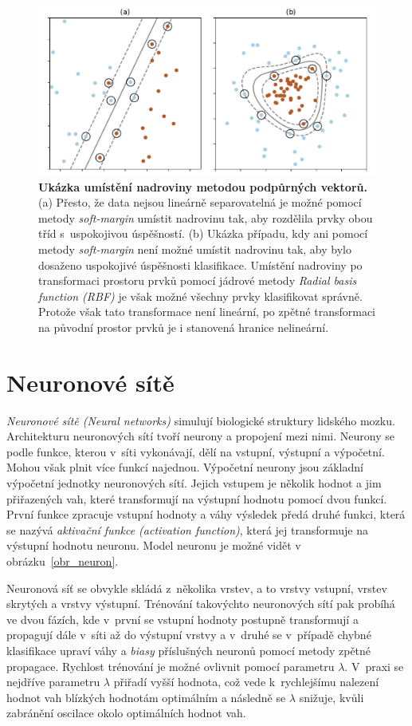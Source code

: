 \begin{figure}[h]
    \centering
    \includegraphics[width=\textwidth]{obrazky/svm.pdf}
    \caption{\textbf{Ukázka umístění nadroviny metodou podpůrných vektorů.} (a) Přesto, že data nejsou lineárně separovatelná je možné pomocí metody \textit{soft-margin} umístit nadrovinu tak, aby rozdělila prvky obou tříd s~uspokojivou úspěšností. (b) Ukázka případu, kdy ani pomocí metody \textit{soft-margin} není možné umístit nadrovinu tak, aby bylo dosaženo uspokojivé úspěšnosti klasifikace. Umístění nadroviny po transformaci prostoru prvků pomocí jádrové metody \textit{Radial basis function (RBF)} je však možné všechny prvky klasifikovat správně. Protože však tato transformace není lineární, po zpětné transformaci na původní prostor prvků je i stanovená hranice nelineární.}
    \label{obr_svm}
\end{figure}

\section{Neuronové sítě}
\label{neuronove_site}
\textit{Neuronové sítě (Neural networks)} simulují biologické struktury lidského mozku. Architekturu neuronových sítí tvoří neurony a propojení mezi nimi. Neurony se podle funkce, kterou v~síti vykonávají, dělí na vstupní, výstupní a výpočetní. Mohou však plnit více funkcí najednou. Výpočetní neurony jsou základní výpočetní jednotky neuronových sítí. Jejich vstupem je několik hodnot a jim přiřazených vah, které transformují na výstupní hodnotu pomocí dvou funkcí. První funkce zpracuje vstupní hodnoty a váhy výsledek předá druhé funkci, která se nazývá \textit{aktivační funkce (activation function)}, která jej transformuje na výstupní hodnotu neuronu. Model neuronu je možné vidět v obrázku~\ref{obr_neuron}.\cite{data_classification}\cite{machine_learning}

Neuronová síť se obvykle skládá z~několika vrstev, a to vrstvy vstupní, vrstev skrytých a vrstvy výstupní. Trénování takovýchto neuronových sítí pak probíhá ve dvou fázích, kde v~první se vstupní hodnoty postupně transformují a propagují dále v~síti až do výstupní vrstvy a v~druhé se v~případě chybné klasifikace upraví váhy a \textit{biasy} příslušných neuronů pomocí metody zpětné propagace. Rychlost trénování je možné ovlivnit pomocí parametru $\lambda$. V~praxi se nejdříve parametru $\lambda$ přiřadí vyšší hodnota, což vede k~rychlejšímu nalezení hodnot vah blízkých hodnotám optimálním a následně se $\lambda$ snižuje, kvůli zabránění oscilace okolo optimálních hodnot vah.\cite{data_classification}\cite{machine_learning}

